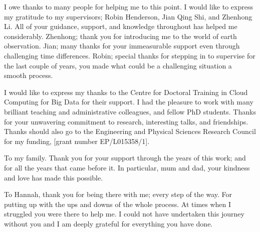 
\begin{acknowledgements}      


I owe thanks to many people for helping me to this point. I would like to express my gratitude to my supervisors; Robin Henderson, Jian Qing Shi, and Zhenhong Li.
All of your guidance, support, and knowledge throughout  has helped me considerably. Zhenhong; thank you for introducing me to the world of earth observation. Jian; many thanks for your immeasurable support even through challenging time differences. Robin; special thanks for stepping in to supervise for the last couple of years, you made what could be a challenging situation a smooth process.

I would like to express my thanks to the Centre for Doctoral Training in Cloud Computing for Big Data for their support. I had the pleasure to work with many brilliant teaching and administrative colleagues, and fellow PhD students. Thanks for your unwavering commitment to research, interesting talks, and friendships.
Thanks should also go to the Engineering and Physical Sciences Research Council for my funding, [grant number EP/L015358/1].

To my family. Thank you for your support through the years of this work; and for all the years that came before it.
In particular, mum and dad, your kindness and love has made this possible.

To Hannah, thank you for being there with me; every step of the way. For putting up with the ups and downs of the whole process. At times when I struggled you were there to help me. I could not have undertaken this journey without you and I am deeply grateful for everything you have done.
\end{acknowledgements}
